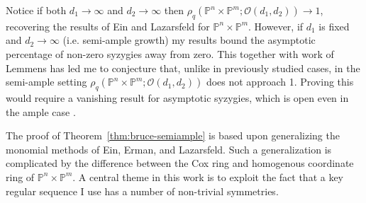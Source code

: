 \documentclass[11pt,reqno]{amsart}
\theoremstyle{remark}
\renewcommand{\O}{\mathcal{O}}
\renewcommand{\P}{\mathbb{P}}
\begin{document}
Notice if both $d_{1}\to \infty$ and $d_{2}\to\infty$ then $\rho_{q}\left(\P^{n}\times\P^{m}; \O(d_1,d_2)\right)\to1$, recovering the results of Ein and Lazarsfeld for $\P^n\times\P^m$. However, if $d_{1}$ is fixed and $d_{2}\to \infty$ (i.e. semi-ample growth) my results bound the asymptotic percentage of non-zero syzygies away from zero. This together with work of Lemmens \cite{lemmens18} has led me to conjecture that, unlike in previously studied cases, in the semi-ample setting $\rho_{q}\left(\P^{n}\times\P^{m}; \O(d_1,d_2)\right)$ does not approach 1. Proving this would require a vanishing result for asymptotic syzygies, which is open even in the ample case  \cite[Conjectures~7.1,~7.5]{einLazarsfeld12}.





The proof of Theorem~\ref{thm:bruce-semiample} is based upon generalizing the monomial methods of Ein, Erman, and Lazarsfeld. Such a generalization is complicated by the difference between the Cox ring and homogenous coordinate ring of $\P^{n}\times\P^{m}$. A central theme in this work is to exploit the fact that a key regular sequence I use has a number of non-trivial symmetries. 
\end{document}

